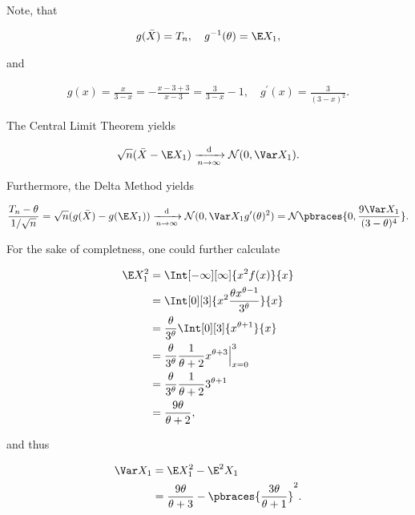 \begin{solution}
\begin{enumerate}[label = (\alph*)]
    Note, that

    \begin{align*}
        g(\bar X) = T_n,
        \quad
        g^{-1}(\theta) = \E X_1,
    \end{align*}

    and

    \begin{align*}
        g(x) = \frac{x}{3 - x} = -\frac{x - 3 + 3}{x - 3} = \frac{3}{3 - x} - 1,
        \quad
        g^\prime(x) = \frac{3}{(3 - x)^2}.
    \end{align*}

    The Central Limit Theorem \cite[lecture 4, slide 61]{EStat} yields

    \begin{align*}
        \sqrt n (\bar X - \E X_1)
        \xrightarrow[n \to \infty]{\text d}
        \mathcal N(0, \Var X_1).
    \end{align*}

    Furthermore, the Delta Method \cite[lecture 5, slide 10]{EStat} yields

    \begin{align*}
        \frac{T_n - \theta}{1 / \sqrt n}
        =
        \sqrt n (g(\bar X) - g(\E X_1))
        \xrightarrow[n \to \infty]{\text d}
        \mathcal N(0, \Var X_1 g^\prime(\theta)^2)
        =
        \mathcal N \pbraces{0, \frac{9 \Var X_1}{(3 - \theta)^4}}.
    \end{align*}

    For the sake of completness, one could further calculate

    \begin{align*}
        \E X_1^2
        & =
        \Int[-\infty][\infty]
        {
            x^2 f(x)
        }{x} \\
        & =
        \Int[0][3]
        {
            x^2 \frac{\theta x^{\theta - 1}}{3^\theta}
        }{x} \\
        & =
        \frac{\theta}{3^\theta}
        \Int[0][3]
        {
            x^{\theta + 1}
        }{x} \\
        & =
        \frac{\theta}{3^\theta}
        \frac{1}{\theta + 2}
        x^{\theta + 3} \Big |_{x=0}^3 \\
        & =
        \frac{\theta}{3^\theta}
        \frac{1}{\theta + 2}
        3^{\theta + 1} \\
        & =
        \frac{9 \theta}{\theta + 2},
    \end{align*}

    and thus

    \begin{align*}
        \Var X_1
        & =
        \E X_1^2 - \E^2 X_1 \\
        & =
        \frac{9 \theta}{\theta + 3}
        -
        \pbraces
        {
            \frac{3 \theta}{\theta + 1}
        }^2.
    \end{align*}

\end{enumerate}

\end{solution}

